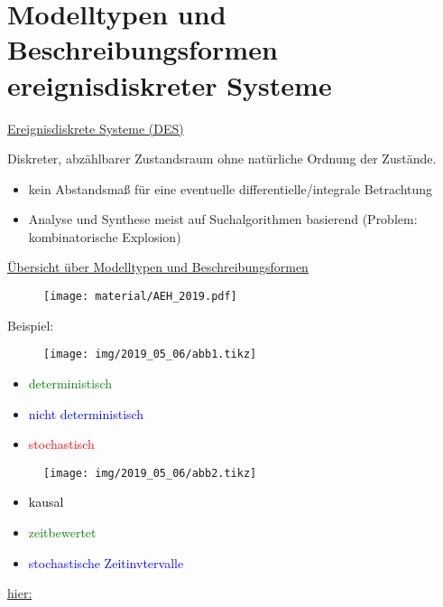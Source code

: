 \section{Modelltypen und Beschreibungsformen ereignisdiskreter Systeme}

\underline{Ereignisdiskrete Systeme (DES)}

Diskreter, abzählbarer Zustandsraum ohne natürliche Ordnung der Zustände.
\begin{itemize}
	\item kein Abstandsmaß für eine eventuelle differentielle/integrale Betrachtung
	\item Analyse und Synthese meist auf Suchalgorithmen basierend (Problem: kombinatorische Explosion)
\end{itemize}

\underline{Übersicht über Modelltypen und Beschreibungsformen}

\begin{figure}[H]
	\centering
	\texttt{[image: material/AEH\_2019.pdf]}
\end{figure}

Beispiel:
\begin{figure}[H]
	\centering
	\texttt{[image: img/2019\_05\_06/abb1.tikz]}
\end{figure}
\begin{itemize}
	\item \textcolor{green}{deterministisch}
	\item \textcolor{blue}{nicht deterministisch}
	\item \textcolor{red}{stochastisch}
\end{itemize}

\begin{figure}[H]
	\centering
	\texttt{[image: img/2019\_05\_06/abb2.tikz]}
\end{figure}
\begin{itemize}
	\item \textcolor{black}{kausal}
	\item \textcolor{green}{zeitbewertet}
	\item \textcolor{blue}{stochastische Zeitinvtervalle}
\end{itemize}

\underline{hier:}


